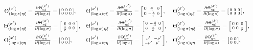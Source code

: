 \documentclass{article}
\begin{document}
\begin{align}
  \Theta_{(\log s)\eta\xi}^{(x')}       & = \tfrac{\partial \Theta_{\eta\xi}^{(x')}}{\partial (\log s)} = \begin{bsmallmatrix} 0 & 0 & 0 \\ 0 & 0 & 0 \end{bsmallmatrix},       &  & \Theta_{(\log s)\eta\xi}^{(\nu')} = \tfrac{\partial \Theta_{\eta\xi}^{(\nu')}}{\partial (\log s)} = \begin{bsmallmatrix} 0 & \frac{s}{\sigma} & 0 \\ 0 & -\frac{s}{\sigma} & 0 \end{bsmallmatrix},             &  & \Theta_{(\log s)\eta\xi}^{(\delta')} = \tfrac{\partial \Theta_{\eta\xi}^{(\delta')}}{\partial (\log s)} = \begin{bsmallmatrix} 0 & 0 & 0 \\ 0 & 0 & 0 \end{bsmallmatrix}, \label{eq:third-derivative-theta-log-s-eta-xi}                  \\
  \Theta_{(\log \sigma)\eta\xi}^{(x')}  & = \tfrac{\partial \Theta_{\eta\xi}^{(x')}}{\partial (\log \sigma)} = \begin{bsmallmatrix} 0 & 0 & 0 \\ \frac{1}{\sigma} & 0 & 0 \end{bsmallmatrix},  &  & \Theta_{(\log \sigma)\eta\xi}^{(\nu')} = \tfrac{\partial \Theta_{\eta\xi}^{(\nu')}}{\partial (\log \sigma)} = \begin{bsmallmatrix} 0 & -\frac{s}{\sigma} & 0 \\ 0 & \frac{s}{\sigma} & 0 \end{bsmallmatrix},   &  & \Theta_{(\log \sigma)\eta\xi}^{(\delta')} = \tfrac{\partial \Theta_{\eta\xi}^{(\delta')}}{\partial (\log \sigma)} = \begin{bsmallmatrix} 0 & 0 & 0 \\ 0 & 0 & \frac{1}{\sigma} \end{bsmallmatrix}, \label{eq:third-derivative-theta-log-sigma-eta-xi}    \\
  \Theta_{(\log s)\eta\eta}^{(x')}      & = \tfrac{\partial \Theta_{\eta\eta}^{(x')}}{\partial (\log s)} = \begin{bsmallmatrix} 0 & 0 \\ 0 & 0 \end{bsmallmatrix},      &  & \Theta_{(\log s)\eta\eta}^{(\nu')} = \tfrac{\partial \Theta_{\eta\eta}^{(\nu')}}{\partial (\log s)} = \begin{bsmallmatrix} \nu' & -\nu' \\ -\nu' & \nu' \end{bsmallmatrix},           &  & \Theta_{(\log s)\eta\eta}^{(\delta')} = \tfrac{\partial \Theta_{\eta\eta}^{(\delta')}}{\partial (\log s)} = \begin{bsmallmatrix} 0 & 0 \\ 0 & 0 \end{bsmallmatrix}, \label{eq:third-derivative-theta-log-s-eta-eta}               \\

\end{align}
\end{document}
